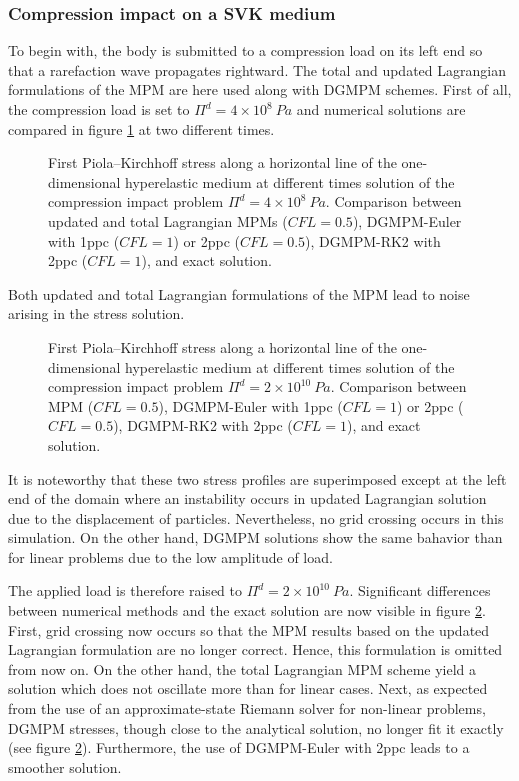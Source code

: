 \subsubsection{Compression impact on a SVK medium}
To begin with, the body is submitted to a compression load on its left end so that a rarefaction wave propagates rightward. The total and updated Lagrangian formulations of the MPM are here used along with DGMPM schemes. First of all, the compression load is set to $\Pi^d= 4\times 10^{8} \: Pa$ and numerical solutions are compared in figure \ref{fig:he_rarefaction_UL} at two different times.
\begin{figure}[h!]
  \centering
  {}
  \caption{First Piola–Kirchhoff stress along a horizontal line of the one-dimensional hyperelastic medium at different times solution of the compression impact problem $\Pi^d= 4\times 10^{8} \: Pa$. Comparison between updated and total Lagrangian MPMs ($CFL=0.5$), DGMPM-Euler with 1ppc ($CFL=1$) or 2ppc ($CFL=0.5$), DGMPM-RK2 with 2ppc ($CFL=1$), and exact solution.}
  \label{fig:he_rarefaction_UL}
\end{figure}
Both updated and total Lagrangian formulations of the MPM lead to noise arising in the stress solution.
\begin{figure}[h!]
  \centering
  {}
  {}
  {}
  \caption{First Piola–Kirchhoff stress along a horizontal line of the one-dimensional hyperelastic medium at different times solution of the compression impact problem $\Pi^d= 2\times 10^{10} \: Pa$. Comparison between MPM ($CFL=0.5$), DGMPM-Euler with 1ppc ($CFL=1$) or 2ppc ($CFL=0.5$), DGMPM-RK2 with 2ppc ($CFL=1$), and exact solution.}
  \label{fig:he_rarefaction}
\end{figure}
It is noteworthy that these two stress profiles are superimposed except at the left end of the domain where an instability occurs in updated Lagrangian solution due to the displacement of particles.
Nevertheless, no grid crossing occurs in this simulation.
On the other hand, DGMPM solutions show the same bahavior than for linear problems due to the low amplitude of load.

The applied load is therefore raised to $\Pi^d= 2\times 10^{10} \: Pa$.
Significant differences between numerical methods and the exact solution are now visible in figure \ref{fig:he_rarefaction}.
First, grid crossing now occurs so that the MPM results based on the updated Lagrangian formulation are no longer correct. Hence, this formulation is omitted from now on.
On the other hand, the total Lagrangian MPM scheme yield a solution which does not oscillate more than for linear cases.
Next, as expected from the use of an approximate-state Riemann solver for non-linear problems, DGMPM stresses, though close to the analytical solution, no longer fit it exactly (see figure \ref{fig:he_rarefaction}).
Furthermore, the use of DGMPM-Euler with 2ppc leads to a smoother solution.

